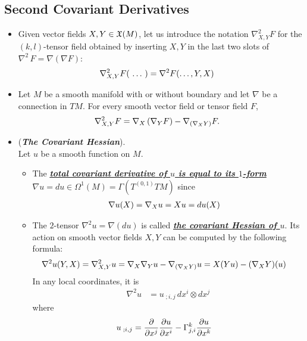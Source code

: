 \documentclass[11pt]{article}
\begin{document}
\subsection{Second Covariant Derivatives}
\begin{itemize}
\item \begin{definition}
Given vector fields $X, Y \in {\mathfrak X}(M)$, let us introduce the notation $\nabla^2_{X, Y}F$ for the $(k,l)$-tensor field obtained by inserting $X,Y$ in the last two slots of $\nabla^2\,F= \nabla(\nabla F)$:
\begin{align*}
\nabla^2_{X, Y}F(\,{}\ldots{}\,) &= \nabla^2 F(\ldots, Y, X)
\end{align*}
\end{definition}

\item \begin{proposition}
Let $M$ be a smooth manifold with or without boundary and let $\nabla$ be a connection in $TM$. For every smooth vector field or tensor field $F$,
\begin{align}
\nabla^2_{X, Y}F &= \nabla_{X}\left(\nabla_{Y}F\right) - \nabla_{(\nabla_{X}{Y})}F.  \label{eqn: second_covariant_derivation}
\end{align}
\end{proposition}

\item \begin{example}(\textbf{\emph{The Covariant Hessian}}).\\
Let $u$ be a smooth function on $M$.
\begin{itemize}
\item The \underline{\emph{\textbf{total covariant derivative of $u$ is equal to its $1$-form}}} $\nabla u = du \in \Omega^1(M) = \Gamma(T^{(0,1)}TM)$ since 
\begin{align*}
\nabla u(X) &= \nabla_{X}{u} = Xu = du(X)
\end{align*}

\item The $2$-tensor $\nabla^2u = \nabla(du)$  is called \underline{\emph{\textbf{the covariant Hessian of $u$}}}. Its action
on smooth vector fields $X,Y$ can be computed by the following formula:
\begin{align}
\nabla^2u(Y, X) = \nabla_{X, Y}^2 u &= \nabla_{X}{\nabla_{Y}{u}} - \nabla_{(\nabla_{X}{Y})}{u} = X(Yu) - (\nabla_{X}{Y})(u)  \label{eqn: covariant_hessian}
\end{align} In any local coordinates, it is
\begin{align*}
\nabla^2u &= u_{\;;i,j}\,dx^i \otimes dx^j
\end{align*} where 
\begin{align*}
u_{\;;i,j} &= \frac{\partial }{ \partial x^j}\frac{\partial u}{ \partial x^i} - \Gamma_{j,i}^{k}\frac{\partial u}{ \partial x^k}
\end{align*}
\end{itemize}
\end{example}
\end{itemize}

\newpage


\end{document}
